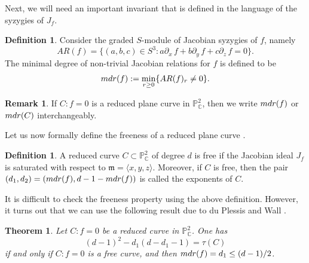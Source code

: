 \documentclass[12pt]{article}
\theoremstyle{plain}
\newtheorem{theorem}[thm]{Theorem}
\theoremstyle{definition}
\newtheorem{definition}[thm]{Definition}
\newtheorem{remark}[thm]{Remark}
\begin{document}
Next, we will need an important invariant that is defined in the language of the syzygies of $J_{f}$.
\begin{definition}
Consider the graded $S$-module of Jacobian syzygies of $f$, namely $$AR(f)=\{(a,b,c)\in S^3 : a\partial_{x} \, f + b \partial_{y} \, f + c \partial_{z} \, f = 0 \}.$$
The minimal degree of non-trivial Jacobian relations for $f$ is defined to be 
$${\rm mdr}(f):=\min_{r\geq 0}\{AR(f)_r\neq 0\}.$$ 
\end{definition}
\begin{remark}
If $C: f=0$ is a reduced plane curve in $\mathbb{P}^{2}_{\mathbb{C}}$, then we write ${\rm mdr}(f)$ or ${\rm mdr}(C)$ interchangeably.
\end{remark}
Let us now formally define the freeness of a reduced plane curve \cite{KS1}.
\begin{definition}
A reduced curve $C \subset \mathbb{P}^{2}_{\mathbb{C}}$ of degree $d$ is free if the Jacobian ideal $J_{f}$ is saturated with respect to $\mathfrak{m} = \langle x,y,z\rangle$. Moreover, if $C$ is free, then the pair $(d_{1}, d_{2}) = ({\rm mdr}(f), d - 1 - {\rm mdr}(f))$ is called the exponents of $C$.
\end{definition}
It is difficult to check the freeness property using the above definition. However, it turns out that we can use the following result due to du Plessis and Wall \cite{duP}.
\begin{theorem}
\label{dddp}
Let $C : f=0$ be a reduced curve in $\mathbb{P}^{2}_{\mathbb{C}}$. One has
\begin{equation}
\label{duPles}
(d-1)^{2} - d_{1}(d-d_{1}-1) = \tau(C)
\end{equation}
if and only if $C : f=0 $ is a free curve, and then ${\rm mdr}(f) = d_{1} \leq (d-1)/2$.
\end{theorem}
\end{document}
